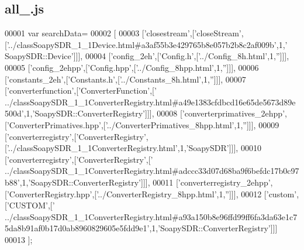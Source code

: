 \subsection{all\+\_.\+js}
\label{all__2_8js_source}

\begin{DoxyCode}
00001 var searchData=
00002 [
00003   [\textcolor{stringliteral}{'closestream'},[\textcolor{stringliteral}{'closeStream'},[\textcolor{stringliteral}{'../classSoapySDR\_1\_1Device.html#a3af55b3e429765b8e057b2b8c2af009b'},1,\textcolor{stringliteral}{'
      SoapySDR::Device'}]]],
00004   [\textcolor{stringliteral}{'config\_2eh'},[\textcolor{stringliteral}{'Config.h'},[\textcolor{stringliteral}{'../Config\_8h.html'},1,\textcolor{stringliteral}{''}]]],
00005   [\textcolor{stringliteral}{'config\_2ehpp'},[\textcolor{stringliteral}{'Config.hpp'},[\textcolor{stringliteral}{'../Config\_8hpp.html'},1,\textcolor{stringliteral}{''}]]],
00006   [\textcolor{stringliteral}{'constants\_2eh'},[\textcolor{stringliteral}{'Constants.h'},[\textcolor{stringliteral}{'../Constants\_8h.html'},1,\textcolor{stringliteral}{''}]]],
00007   [\textcolor{stringliteral}{'converterfunction'},[\textcolor{stringliteral}{'ConverterFunction'},[\textcolor{stringliteral}{'
      ../classSoapySDR\_1\_1ConverterRegistry.html#a49e1383cfdbcd16e65de5673d89e500d'},1,\textcolor{stringliteral}{'SoapySDR::ConverterRegistry'}]]],
00008   [\textcolor{stringliteral}{'converterprimatives\_2ehpp'},[\textcolor{stringliteral}{'ConverterPrimatives.hpp'},[\textcolor{stringliteral}{'../ConverterPrimatives\_8hpp.html'},1,\textcolor{stringliteral}{''}]]],
00009   [\textcolor{stringliteral}{'converterregistry'},[\textcolor{stringliteral}{'ConverterRegistry'},[\textcolor{stringliteral}{'../classSoapySDR\_1\_1ConverterRegistry.html'},1,\textcolor{stringliteral}{'SoapySDR'}]]],
00010   [\textcolor{stringliteral}{'converterregistry'},[\textcolor{stringliteral}{'ConverterRegistry'},[\textcolor{stringliteral}{'
      ../classSoapySDR\_1\_1ConverterRegistry.html#adccc33d07d68ba9f6befdc17b0c97b88'},1,\textcolor{stringliteral}{'SoapySDR::ConverterRegistry'}]]],
00011   [\textcolor{stringliteral}{'converterregistry\_2ehpp'},[\textcolor{stringliteral}{'ConverterRegistry.hpp'},[\textcolor{stringliteral}{'../ConverterRegistry\_8hpp.html'},1,\textcolor{stringliteral}{''}]]],
00012   [\textcolor{stringliteral}{'custom'},[\textcolor{stringliteral}{'CUSTOM'},[\textcolor{stringliteral}{'
      ../classSoapySDR\_1\_1ConverterRegistry.html#a93a150b8e96ffd99ff6fa3da63e1c75da8b91af0b17d0ab8960829605e5fdd9e1'},1,\textcolor{stringliteral}{'SoapySDR::ConverterRegistry'}]]]
00013 ];
\end{DoxyCode}

